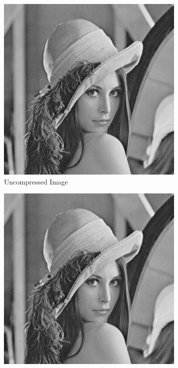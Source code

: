 \begin{figure}
  \centering
  \begin{subfigure}[b]{0.4\textwidth}
    \includegraphics[width=\textwidth]{Chapter2/Images/lenna512.png}
    \caption{Uncompressed Image}
    \label{fig:ch2:lenna_orig}
  \end{subfigure}
  \begin{subfigure}[b]{0.4\textwidth}
    \includegraphics[width=\textwidth]{Chapter2/Images/lenna512_dct.png}

\end{subfigure}
\end{figure}
